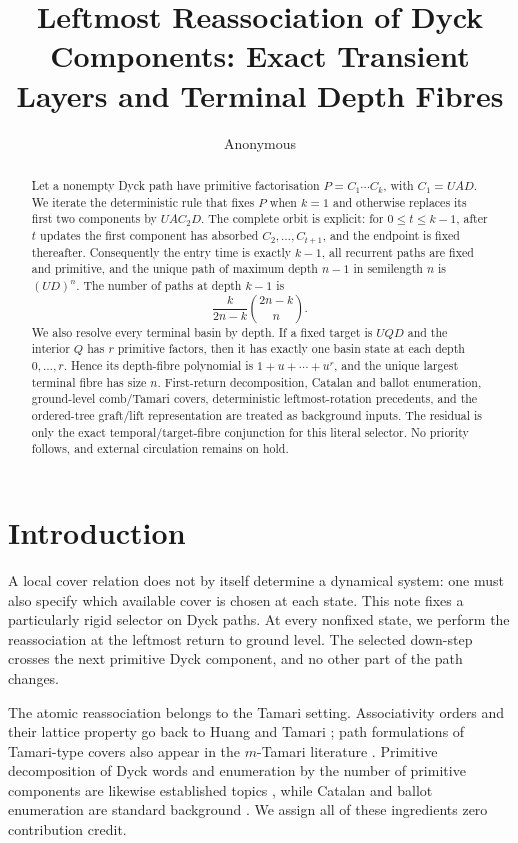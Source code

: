 \documentclass[10pt,a4paper]{amsart}
\title[Leftmost Dyck reassociation]{Leftmost Reassociation of Dyck
Components: Exact Transient Layers and Terminal Depth Fibres}
\author{Anonymous}
\date{}
\theoremstyle{definition}
\theoremstyle{remark}
\begin{document}
\begin{abstract}
Let a nonempty Dyck path have primitive factorisation
$P=C_1\cdots C_k$, with $C_1=UAD$.  We iterate the deterministic rule that
fixes $P$ when $k=1$ and otherwise replaces its first two components by
$UAC_2D$.  The complete orbit is explicit: for $0\le t\le k-1$, after $t$
updates the first component has absorbed $C_2,\ldots,C_{t+1}$, and the
endpoint is fixed thereafter.  Consequently the entry time is
exactly $k-1$, all recurrent paths are fixed and primitive, and the unique
path of maximum depth $n-1$ in semilength $n$ is $(UD)^n$.  The number of
paths at depth $k-1$ is
\[
                 \frac{k}{2n-k}\binom{2n-k}{n}.
\]
We also resolve every terminal basin by depth.  If a fixed target is $UQD$
and the interior $Q$ has $r$ primitive factors, then it has exactly one basin
state at each depth $0,\ldots,r$.  Hence its depth-fibre polynomial is
$1+u+\cdots+u^r$, and the unique largest terminal fibre has size $n$.
First-return decomposition, Catalan and ballot enumeration, ground-level
comb/Tamari covers, deterministic leftmost-rotation precedents, and the
ordered-tree graft/lift representation are treated as background inputs.  The
residual is only the exact temporal/target-fibre conjunction for this literal
selector.  No priority follows, and external circulation remains on hold.
\end{abstract}

\maketitle

\section{Introduction}\label{sec:introduction}

A local cover relation does not by itself determine a dynamical system: one
must also specify which available cover is chosen at each state.  This note
fixes a particularly rigid selector on Dyck paths.  At every nonfixed state,
we perform the reassociation at the leftmost return to ground level.  The
selected down-step crosses the next primitive Dyck component, and no other
part of the path changes.

The atomic reassociation belongs to the Tamari setting.  Associativity orders
and their lattice property go back to Huang and Tamari
\cite{HuangTamari1972Associativity}; path formulations of Tamari-type covers
also appear in the $m$-Tamari literature
\cite{BousquetMelouFusyPrevilleRatelle2012Intervals}.  Primitive decomposition
of Dyck words and enumeration by the number of primitive components are
likewise established topics \cite{PanayotopoulosSapounakis2002Prime}, while
Catalan and ballot enumeration are standard background
\cite{Stanley2015Catalan}.  We assign all of these ingredients zero
contribution credit.
\end{document}
